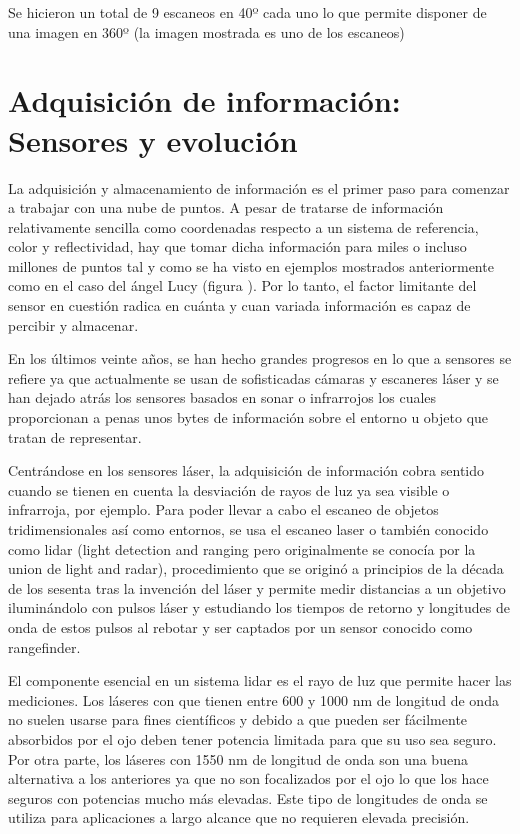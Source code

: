 Se hicieron un total de 9 escaneos en 40º cada uno lo que permite disponer de una imagen en 360º (la imagen mostrada es uno de los escaneos)

\section{Adquisición de información: Sensores y evolución}

La adquisición y almacenamiento de información es el primer paso para comenzar a trabajar con una nube de puntos. A pesar de tratarse de información relativamente sencilla como coordenadas respecto a un sistema de referencia, color y reflectividad, hay que tomar dicha información para miles o incluso millones de puntos tal y como se ha visto en ejemplos mostrados anteriormente como en el caso del ángel Lucy (figura ). Por lo tanto, el factor limitante del sensor en cuestión radica en cuánta y cuan variada información es capaz de percibir y almacenar.

En los últimos veinte años, se han hecho grandes progresos en lo que a sensores se refiere ya que actualmente se usan de sofisticadas cámaras y escaneres láser y se han dejado atrás los sensores basados en sonar o infrarrojos los cuales proporcionan a penas unos bytes de información sobre el entorno u objeto que tratan de representar.

Centrándose en los sensores láser, la adquisición de información cobra sentido cuando se tienen en cuenta la desviación de rayos de luz ya sea visible o infrarroja, por ejemplo. Para poder llevar a cabo el escaneo de objetos tridimensionales así como entornos, se usa el escaneo laser o también conocido como lidar (light detection and ranging pero originalmente se conocía por la union de light and radar), 
procedimiento que se originó a principios de la década de los sesenta tras la invención del láser y permite medir distancias a un objetivo iluminándolo con pulsos láser y estudiando los tiempos de retorno y longitudes de onda de estos pulsos al rebotar y ser captados por un sensor conocido como rangefinder.

El componente esencial en un sistema lidar es el rayo de luz que permite hacer las mediciones. Los láseres con que tienen entre 600 y 1000 nm de longitud de onda no suelen usarse para fines científicos y debido a que pueden ser fácilmente absorbidos por el ojo deben tener potencia limitada para que su uso sea seguro.
Por otra parte, los láseres con 1550 nm de longitud de onda son una buena alternativa a los anteriores ya que no son focalizados por el ojo lo que los hace seguros con potencias mucho más elevadas. Este tipo de longitudes de onda se utiliza para aplicaciones a largo alcance que no requieren elevada precisión. 


